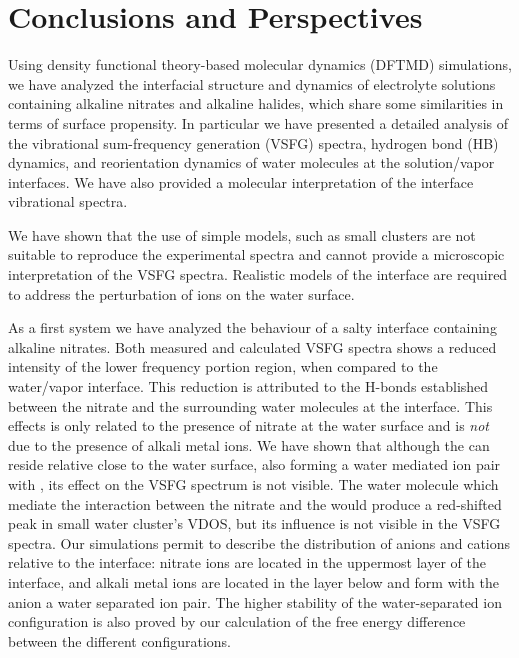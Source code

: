 \chapter{Conclusions and Perspectives}\label{CHAPTER_Summary}
Using density functional theory-based molecular dynamics (DFTMD) simulations, we have analyzed the interfacial structure and dynamics of electrolyte solutions containing alkaline nitrates and alkaline halides,
which share some similarities in terms of surface propensity.
In particular we have presented a detailed analysis of the vibrational sum-frequency generation (VSFG) spectra, hydrogen bond (HB) dynamics, and reorientation dynamics of water molecules at the solution/vapor interfaces. 
We have also provided a molecular interpretation of the interface vibrational spectra. 

We have shown that the use of simple models, such as small clusters are not suitable to reproduce the experimental spectra 
and cannot provide a microscopic interpretation of the VSFG spectra. Realistic models of the interface are required to address the 
perturbation of ions on the water surface. 

As a first system we have analyzed the behaviour of a salty interface containing alkaline nitrates.
Both measured and calculated VSFG spectra shows a reduced intensity of the lower frequency portion region, 
when compared to the water/vapor interface. 
This reduction is attributed to the H-bonds established between the nitrate and the surrounding water molecules at the interface.
This effects is only related to the presence of nitrate at the water surface and is \emph{not} due to the presence of alkali metal ions.
We have shown that although the \Li can reside relative close to the water surface, also forming a water mediated
ion pair with \nit, its effect on the VSFG spectrum is not visible. The water molecule which mediate the interaction 
between the nitrate and the \Li would produce a red-shifted peak in small water cluster's VDOS, but its influence is not visible 
in the VSFG spectra. Our simulations permit to describe the distribution of anions and cations relative to the interface: 
nitrate ions are located in the uppermost layer of the interface, and alkali metal ions are located in the layer below 
and form with the anion a water separated ion pair.
The higher stability of the water-separated ion configuration is also proved by our calculation of the free energy difference between the different configurations. 

